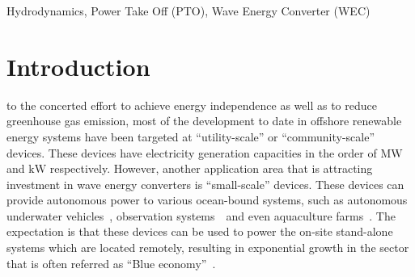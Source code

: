 \documentclass[10pt,journal,a4paper,twoside]{./IMEJ}
\begin{document}
\begin{abstract}
Recent developments in oscillating Wave Energy Convertors (WECs) point toward two popular design concepts. First design is a semi-submerged system in which a surface piercing float reacts either against a drag dominated heave plate or an inertia dominated reaction body.  While the second design is a single body system that reacts against the ocean floor. The first design either employs a rigid spar connection between the actuator and the reaction body or a flexible tether; however, the second design uses a flexible tether between the actuator and the foundation. In this work, a two-body sub-surface WEC is proposed in which the submerged float reacts against a base that is actively dynamic. The dynamics of the reacting body is influenced by both the buoyancy parameters and the PTO generated tether tension. As a result, the two-body system oscillates either out-of-phase or in-phase. In this work, the optimal hydrostatic conditions that result in a design that can generate mechanical power in single degree of freedom motion, under the wave excitation are discussed. Multiple design candidates are evaluated under different wave conditions and exhaustive sensitivity analyses are carried out on various design parameters. The hydrodynamic analysis is carried out for different wave conditions observed off different coasts of the USA. Optimal PTO parameters are determined for various designs. The hydrodynamic and time domain analyses is carried out using \enquote{Ansys-Aqwa\textregistered{}}.\\
\end{abstract}

\begin{IMEJkeywords}
Hydrodynamics, Power Take Off (PTO), Wave Energy Converter (WEC)
\end{IMEJkeywords}
\IMEJpeerreviewmaketitle

\section{Introduction}
 to the concerted effort to achieve energy independence as well as to reduce greenhouse gas emission, most of the development to date in offshore renewable energy systems have been targeted at “utility-scale” or “community-scale” devices. These devices have electricity generation capacities in the order of $\mathrm{MW}$ and $\mathrm{kW}$ respectively. However, another application area that is attracting investment in wave energy converters is “small-scale” devices. These devices can provide autonomous power to various ocean-bound systems, such as autonomous underwater vehicles~\cite{chen2024unified}, observation systems~\cite{doe2018wind}~and even aquaculture farms~\cite{EWR_Dataset_35}. The expectation is that these devices can be used to power the on-site stand-alone systems which are located remotely, resulting in exponential growth in the sector that is often referred as “Blue economy”~\cite{green2019enabling,cavagnaro2020powering}.
\end{document}

